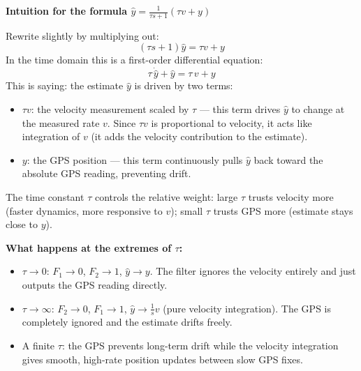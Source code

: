 \documentclass[12pt, a4paper]{article}
\begin{document}
\begin{notebox}
  \textbf{Intuition for the formula $\hat{y} = \frac{1}{\tau s+1}(\tau v + y)$}

  Rewrite slightly by multiplying out:
  \[
    (\tau s + 1)\hat{y} = \tau v + y
  \]
  In the time domain this is a first-order differential equation:
  \[
    \tau\,\dot{\hat{y}} + \hat{y} = \tau\, v + y
  \]
  This is saying: the estimate $\hat{y}$ is driven by two terms:
  \begin{itemize}[leftmargin=1.2em, itemsep=3pt]
    \item $\tau v$: the velocity measurement scaled by $\tau$ --- this term
      drives $\hat{y}$ to change at the measured rate $v$.
      Since $\tau v$ is proportional to velocity, it acts like integration
      of $v$ (it adds the velocity contribution to the estimate).
    \item $y$: the GPS position --- this term continuously pulls $\hat{y}$
      back toward the absolute GPS reading, preventing drift.
  \end{itemize}
  The time constant $\tau$ controls the relative weight: large $\tau$
  trusts velocity more (faster dynamics, more responsive to $v$); small
  $\tau$ trusts GPS more (estimate stays close to $y$).

  \textbf{What happens at the extremes of $\tau$:}
  \begin{itemize}[leftmargin=1.2em, itemsep=2pt]
    \item $\tau \to 0$: $F_1 \to 0$, $F_2 \to 1$, $\hat{y} \to y$.
      The filter ignores the velocity entirely and just outputs the GPS
      reading directly.
    \item $\tau \to \infty$: $F_2 \to 0$, $F_1 \to 1$, $\hat{y} \to
      \tfrac{1}{s}v$ (pure velocity integration).
      The GPS is completely ignored and the estimate drifts freely.
    \item A finite $\tau$: the GPS prevents long-term drift while the
      velocity integration gives smooth, high-rate position updates between
      slow GPS fixes.
  \end{itemize}
\end{notebox}
\end{document}
